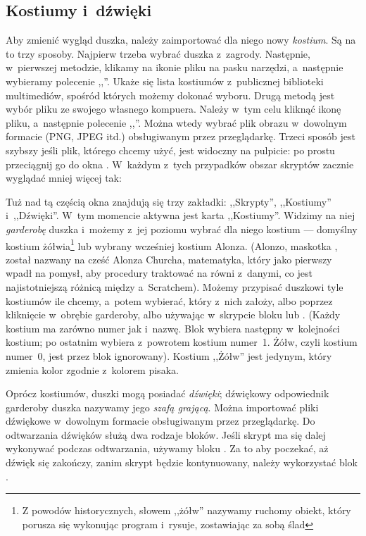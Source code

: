 \documentclass{report}
\begin{document}
\subsection{Kostiumy i~dźwięki}

Aby zmienić wygląd duszka, należy zaimportować dla niego nowy \emph{kostium}. Są na to trzy sposoby. Najpierw trzeba wybrać duszka z~zagrody. Następnie, w~pierwszej metodzie, klikamy na ikonie pliku  na pasku narzędzi, a~następnie wybieramy polecenie ,,''. Ukaże się lista kostiumów z~publicznej biblioteki multimediów, spośród których możemy dokonać wyboru. Drugą metodą jest wybór pliku ze swojego własnego kompuera. Należy w~tym celu kliknąć ikonę pliku, a~następnie polecenie ,,''. Można wtedy wybrać plik obrazu w~dowolnym formacie (PNG, JPEG itd.) obsługiwanym przez przeglądarkę. Trzeci sposób jest szybszy jeśli plik, którego chcemy użyć, jest widoczny na pulpicie: po prostu przeciągnij go do okna . W~każdym z~tych przypadków obszar skryptów zacznie wyglądać mniej więcej tak:


Tuż nad tą częścią okna znajdują się trzy zakładki: ,,Skrypty'', ,,Kostiumy'' i~,,Dźwię\-ki''. W~tym momencie aktywna jest karta ,,Kostiumy''. Widzimy na niej \emph{garderobę} duszka i~możemy z~jej poziomu wybrać dla niego kostium --- domyślny kostium żółwia\footnote{Z powodów historycznych, słowem ,,żółw'' nazywamy ruchomy obiekt, który porusza się wykonując program i~rysuje, zostawiając za sobą ślad} lub wybrany wcześniej kostium Alonza. (Alonzo, maskotka , został nazwany na cześć Alonza Churcha, matematyka, który jako pierwszy wpadł na pomysł, aby procedury traktować na równi z~danymi, co jest najistotniejszą różnicą między  a~Scratchem). Możemy przypisać duszkowi tyle kostiumów ile chcemy, a~potem wybierać, który z~nich założy, albo poprzez kliknięcie w~obrębie garderoby, albo używając w~skrypcie bloku  lub . (Każdy kostium ma zarówno numer jak i~nazwę. Blok  wybiera następny w~kolejności kostium; po ostatnim wybiera z~powrotem kostium numer~1. Żółw, czyli kostium numer~0, jest przez blok  ignorowany). Kostium ,,Żółw'' jest jedynym, który zmienia kolor zgodnie z~kolorem pisaka.

Oprócz kostiumów, duszki mogą posiadać \emph{dźwięki}; dźwiękowy odpowiednik garderoby duszka nazywamy jego \emph{szafą grającą}. Można importować pliki dźwiękowe w~dowolnym formacie obsługiwanym przez przeglądarkę. Do odtwarzania dźwięków służą dwa rodzaje bloków. Jeśli skrypt ma się dalej wykonywać podczas odtwarzania, używamy bloku . Za to aby poczekać, aż dźwięk się zakończy, zanim skrypt będzie kontynuowany, należy wykorzystać blok .
\end{document}
